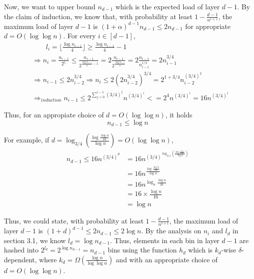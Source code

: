 \documentclass[a4paper, english]{paper}
\begin{document}
Now, we want to upper bound $n_{d-1}$ which is the expected load of layer $d-1$. By the claim of induction, we know that, with probability at least $1-\frac{d-1}{n^{c+1}}$, the maximum load of layer $d-1$ is $(1+\alpha)^{d-1}n_{d-1}\le2n_{d-1}$ for appropriate $d=O(\log\log n)$. For every $i\in[d-1]$, 
\begin{align*}
&\qquad l_i =\lfloor\frac{\log n_{i-1}}4\rfloor \ge \frac{\log n_{i-1}}4 -1\\
&\Rightarrow n_i = \frac{n_{i-1}}{2^{l_i}}\le \frac{n_{i-1}}{2^{\frac{\log n_{i-1}}4 -1}} = 2\frac{n_{i-1}}{2^{\frac{\log n_{i-1}}4}}=2\frac{n_{i-1}}{n_{i-1}^{1/4}}= 2 n_{i-1}^{3/4}\\
&\Rightarrow n_{i-1}\le 2 n_{i-2}^{3/4}\Rightarrow n_i\le 2 (2 n_{i-2}^{3/4})^{3/4}=2^{1+3/4}n_{i-2}^{(3/4)^2}\\
&\Rightarrow_{induction} n_{i-1}\le 2^{\sum_{j=0}^{i-1}(3/4)^j}n^{(3/4)^i}<=2^4n^{(3/4)^i}=16n^{(3/4)^i}
\end{align*}\par
 Thus, for an appropiate choice of $d = O(\log\log n)$, it holds $$n_{d-1}\le \log n$$\par
 For example, if $d = \log_{3/4}\left( \frac{\log \frac{\log n}{16}}{\log n}\right)=O(\log\log n)$,
\begin{align*}
n_{d-1}\le16n^{(3/4)^d}&=16n^{(3/4)^{\log_{3/4}\left( \frac{\log \frac{\log n}{16}}{\log n}\right)}}\\
&= 16n^{\frac{\log \frac{\log n}{16}}{\log n}}\\
&= 16n^{\log_n \frac{\log n}{16}}\\
&= 16\times\frac{\log n}{16}\\
&= \log n
\end{align*}\par
Thus, we could state, with probability at least $1-\frac{d-1}{n^{c+1}}$, the maximum load of layer $d-1$ is $(1+d)^{d-1}\le2n_{d-1}\le2\log n$. By the analysis on $n_i$ and $l_d$ in section 3.1, we know $l_d = \log n_{d-1}$. Thus, elements in each bin in layer $d-1$ are hashed into $2^{l_d} = 2^{\log n_{d-1}} = n_{d-1}$ bins using the function $h_d$ which is $k_d$-wise $\delta$-dependent, where $k_d=\Omega(\frac{\log n}{\log\log n})$ and with an appropriate choice of $d=O(\log\log n)$.\\
\end{document}
